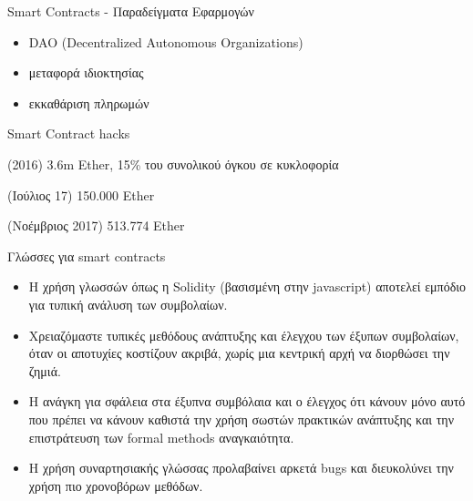 \documentclass[10pt]{beamer}
\begin{document}


\begin{frame}{Smart Contracts - Παραδείγματα Εφαρμογών}

\begin{itemize}
    \item DAO (Decentralized Autonomous Organizations)
    \item μεταφορά ιδιοκτησίας
    \item εκκαθάριση πληρωμών
\end{itemize}

\end{frame}

\begin{frame}{Smart Contract hacks}

\begin{description}[leftmargin=-.5in]
\item<1->[ ~~~~~~~DAO hack] (2016) 3.6m Ether, 15\% του συνολικού όγκου σε κυκλοφορία
\item<2->[Parity wallet hack] (Ιούλιος 17) 150.000 Ether
\item<3->[Parity Freeze hack] (Νοέμβριος 2017) 513.774 Ether
\end{description}


\end{frame}

\begin{frame}{Γλώσσες για smart contracts}

\begin{itemize}

\item<1-> Η χρήση γλωσσών όπως η Solidity (βασισμένη στην javascript)
αποτελεί εμπόδιο για τυπική ανάλυση των συμβολαίων.

\item<2-> Χρειαζόμαστε  τυπικές μεθόδους ανάπτυξης και έλεγχου των
έξυπων συμβολαίων, όταν οι αποτυχίες κοστίζουν ακριβά, χωρίς μια κεντρική αρχή να διορθώσει την ζημιά.
\item<3->
Η ανάγκη για σφάλεια στα έξυπνα συμβόλαια και ο έλεγχος ότι κάνουν μόνο αυτό που πρέπει να κάνουν καθιστά την χρήση σωστών πρακτικών ανάπτυξης και την επιστράτευση των formal methods αναγκαιότητα.
\item<4->
Η χρήση συναρτησιακής γλώσσας προλαβαίνει αρκετά bugs και διευκολύνει
την χρήση πιο χρονοβόρων μεθόδων.
\end{itemize}

\end{frame}
\end{document}
